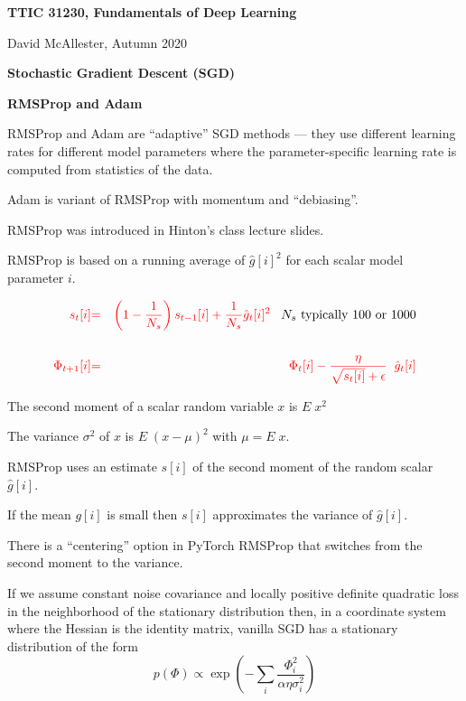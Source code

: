 


\newcommand{\solution}[1]{\bigskip {\bf Solution}: #1}



{\Huge
  \centerline{\bf TTIC 31230, Fundamentals of Deep Learning}
  \bigskip
  \centerline{David McAllester, Autumn 2020}
  \vfill
  \centerline{\bf Stochastic Gradient Descent (SGD)}
  \vfill
  \centerline{\bf RMSProp and Adam}


RMSProp and Adam are ``adaptive'' SGD methods --- they use different learning rates for different model parameters where the parameter-specific learning rate is
computed from statistics of the data.

\vfill
Adam is variant of RMSProp with momentum and ``debiasing''.


RMSProp was introduced in Hinton's class lecture slides.

\vfill
RMSProp is based on a running average of $\hat{g}[i]^2$ for each scalar model parameter $i$.

\begin{eqnarray*}
{\color{red} s_t[i]} & {\color{red} =} & {\color{red} \left(1-\frac{1}{N_s}\right) s_{t-1}[i] + \frac{1}{N_s} \hat{g}_t[i]^2}\;\;\;\mbox{$N_s$ typically 100 or 1000} \\
\\
{\color{red} \Phi_{t+1}[i]} & {\color{red} =} & {\color{red} \Phi_t[i] - \frac{\eta}{\sqrt{s_t[i]} + \epsilon}\;\; \hat{g}_t[i]}
\end{eqnarray*}

The second moment of a scalar random variable $x$ is $E\;x^2$

\vfill
The variance $\sigma^2$ of $x$ is $E \;(x - \mu)^2$ with $\mu = E\;x$.

\vfill
RMSProp uses an estimate $s[i]$ of the second moment of the random scalar $\hat{g}[i]$.

\vfill
If the mean $g[i]$ is small then $s[i]$ approximates the variance of $\hat{g}[i]$.

\vfill
There is a ``centering'' option in PyTorch RMSProp that switches from the second moment to the variance.


If we assume constant noise covariance and locally positive definite quadratic loss in the neighborhood of the stationary distribution then, in a coordinate system
where the Hessian is the identity matrix, vanilla SGD has a stationary distribution of the form
$$p(\Phi) \propto \exp\left(-\sum_i \frac{{\Phi_i^2}}{\alpha\eta\sigma_i^2}\right)$$

}
